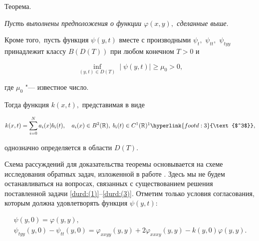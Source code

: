 {\small \sc Теорема.}  {\it Пусть выполнены предположения о функции $\varphi(x,y),$ сделанные выше$.$ 

Кроме того$,$ пусть функция $\psi(y,t)$  вместе с производными $\psi_t,$  $ \psi_{tt},$  $\psi_{tyy}$ принадлежит  классу $B\left(D(T)\right)$ при любом конечном  $T>0$ и

\begin{equation}

 \label{durd:(4)}

\inf_{(y,t)\in {D(T)}}\mid\psi(y,t)\mid\geq \mu_0>0, 

\end{equation}

где $\mu_0$ "--- известное число$.$

Тогда   функция $k(x,t),$  представимая в виде

\begin{equation}

 \label{durd:(5)}

k(x,t)=\sum_{i=0}^N a_i(x)b_i(t), \quad  a_i(x)\in B^2({\Bbb R}), \; b_i(t)\in C^1({\Bbb R})\footnotemark{\protect\hyperlink{footd:3}{\text{$^3$}}},

\end{equation}

однозначно определяется в области $D(T).$

}






\smallskip



Схема рассуждений для доказательства теоремы основывается на схеме исследования обратных задач, изложенной в работе \cite{durd:13}. Здесь мы не будем останавливаться на  вопросах, связанных с существованием решения поставленной задачи \eqref{durd:(1)}--\eqref{durd:(3)}. Отметим только условия согласования, которым должна удовлетворять функция $\psi(y,t)$: 

\begin{gather}

\psi(y, 0)=\varphi(y,y),

\\

\psi_{tyy}(y, 0)-\psi_{tt}(y, 0)=\varphi_{xxyy}(y,y)+2\varphi_{xxxy}(y,y)-k(y, 0)\varphi(y,y).

\end{gather}









